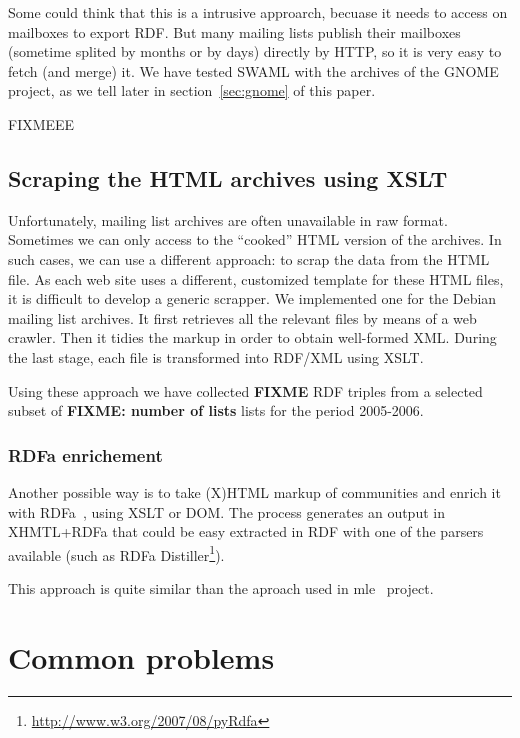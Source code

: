 \documentclass{../templates/www2008-submission}
\begin{document}
Some could think that this is a intrusive approarch, becuase it needs
to access on mailboxes to export RDF. But many mailing lists publish
their mailboxes (sometime splited by months or by days) directly by 
HTTP, so it is very easy to fetch (and merge) it. We have tested SWAML 
with the archives of the GNOME project, as we tell later in 
section~\ref{sec:gnome} of this paper. 

FIXMEEE	

\subsection{Scraping the HTML archives using XSLT}

Unfortunately, mailing list archives are often unavailable in raw
format. Sometimes we can only access to the ``cooked'' HTML
version of the archives. In such cases, we can use a different
approach: to scrap the data from the HTML file. As each web site
uses a different, customized template for these HTML files, it is
difficult to develop a generic scrapper. We implemented one
for the Debian mailing list archives. It first retrieves all
the relevant files by means of a web crawler. Then it tidies the
markup in order to obtain well-formed XML. During the last stage,
each file is transformed into RDF/XML using XSLT.

Using these approach we have collected \textbf{FIXME} RDF triples
from a selected subset of \textbf{FIXME: number of lists} lists for
the period 2005-2006.

\subsubsection{RDFa enrichement}

Another possible way is to take (X)HTML markup of communities and
enrich it with RDFa~\cite{Birbeck2006}, using XSLT or DOM. The process
generates an output in XHMTL+RDFa that could be easy extracted in RDF 
with one of the parsers available (such as RDFa Distiller\footnote{\url{http://www.w3.org/2007/08/pyRdfa}}).

This approach is quite similar than the aproach used in mle~\cite{Hausenblas2007}
project.



\section{Common problems}
\end{document}
